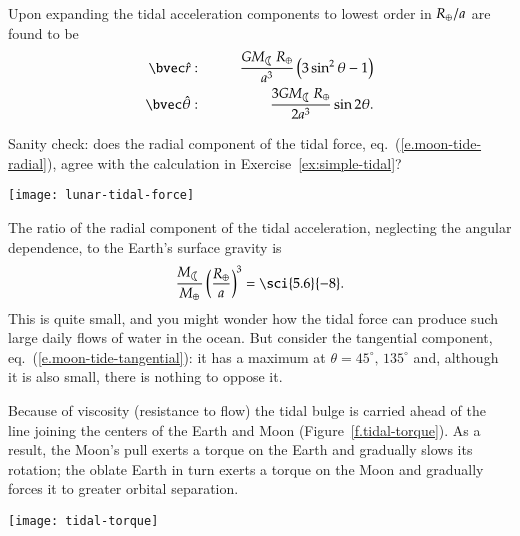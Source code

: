 Upon expanding the tidal acceleration components to lowest order in $R_{\oplus}/a$ are found to be
\begin{eqnarray}
\label{e.moon-tide-radial}\rhat: &\qquad& \frac{GM_{\Moon}R_{\Earth}}{a^{3}}\left(3\sin^{2}\theta - 1\right)\\
\label{e.moon-tide-tangential}\thetahat: &\qquad& \frac{3GM_{\Moon}R_{\Earth}}{2a^{3}}\sin2\theta.
\end{eqnarray}
\begin{exercisebox}
Sanity check: does the radial component of the tidal force, eq.~(\ref{e.moon-tide-radial}), agree with the calculation in Exercise~\ref{ex:simple-tidal}?
\end{exercisebox}
\begin{marginfigure}
\texttt{[image: lunar-tidal-force]}
\caption[Components of the tidal force]{Tidal force field exerted by the Moon on the Earth.
\label{f.lunar-tidal-force}}
\end{marginfigure}
\noindent The ratio of the radial component of the tidal acceleration, neglecting the angular dependence, to the Earth's surface gravity is
\[ \frac{M_{\Moon}}{M_{\Earth}}\left(\frac{R_{\Earth}}{a}\right)^{3} = \sci{5.6}{-8}. \]
This is quite small, and you might wonder how the tidal force can produce such large daily flows of water in the ocean.  But consider the tangential component, eq.~(\ref{e.moon-tide-tangential}): it has a maximum at $\theta = 45^{\circ},\,135^{\circ}$ and, although it is also small, there is nothing to oppose it.

 Because of viscosity (resistance to flow) the tidal bulge is carried ahead of the line joining the centers of the Earth and Moon (Figure~\ref{f.tidal-torque}).  As a result, the Moon's pull exerts a torque on the Earth and gradually slows its rotation; the oblate Earth in turn exerts a torque on the Moon and gradually forces it to greater orbital separation.

\begin{figure*}
\texttt{[image: tidal-torque]}
\caption[Torque on the Earth's tidal bulge]{The torque resulting from the misalignment of Earth's tidal bulge.
\label{f.tidal-torque}}
\end{figure*}

